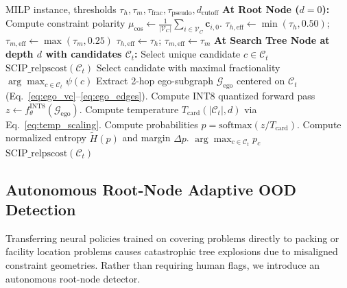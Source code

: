 \documentclass[10pt,twocolumn,letterpaper]{article}
\theoremstyle{plain}
\theoremstyle{definition}
\theoremstyle{remark}
\begin{document}
\begin{algorithm}[t]
\caption{Confidence-Gated Neural Branching Engine}
\label{alg:full_stack}
\begin{algorithmic}[1]
\REQUIRE MILP instance, thresholds $\tau_h, \tau_m, \tau_{\text{frac}}, \tau_{\text{pseudo}}, d_{\text{cutoff}}$
\STATE \textbf{At Root Node ($d = 0$):}
\STATE Compute constraint polarity $\mu_{\text{cos}} \leftarrow \frac{1}{|\mathcal{V}_C|} \sum_{i \in \mathcal{V}_C} \mathbf{c}_{i, 0}$.
    \STATE $\tau_{h,\text{eff}} \leftarrow \min(\tau_h, 0.50)$; $\tau_{m,\text{eff}} \leftarrow \max(\tau_m, 0.25)$ 
\ELSE
    \STATE $\tau_{h,\text{eff}} \leftarrow \tau_h$; $\tau_{m,\text{eff}} \leftarrow \tau_m$
\ENDIF
\STATE \textbf{At Search Tree Node at depth $d$ with candidates $\mathcal{C}_t$:}
    \RETURN Select unique candidate $c \in \mathcal{C}_t$
\ENDIF
{}
    \RETURN $\text{SCIP\_relpscost}(\mathcal{C}_t)$ 
\ENDIF
{}
    \RETURN Select candidate with maximal fractionality 
\ENDIF
{}
    \RETURN $\arg\max_{c \in \mathcal{C}_t} \psi(c)$ 
\ENDIF
\STATE Extract 2-hop ego-subgraph $\mathcal{G}_{\text{ego}}$ centered on $\mathcal{C}_t$ (Eq.~\ref{eq:ego_vc}--\ref{eq:ego_edges}).
\STATE Compute INT8 quantized forward pass $z \leftarrow f_\theta^{\text{INT8}}(\mathcal{G}_{\text{ego}})$.
\STATE Compute temperature $T_{\text{card}}(|\mathcal{C}_t|, d)$ via Eq.~\ref{eq:temp_scaling}.
\STATE Compute probabilities $p = \text{softmax}(z / T_{\text{card}})$.
\STATE Compute normalized entropy $\tilde{H}(p)$ and margin $\Delta p$.
    \RETURN $\arg\max_{c \in \mathcal{C}_t} p_c$ 
\ELSE
    \RETURN $\text{SCIP\_relpscost}(\mathcal{C}_t)$ 
\ENDIF
\end{algorithmic}
\end{algorithm}

\subsection{Autonomous Root-Node Adaptive OOD Detection}
Transferring neural policies trained on covering problems directly to packing or facility location problems causes catastrophic tree explosions due to misaligned constraint geometries. Rather than requiring human flags, we introduce an autonomous root-node detector.
\end{document}
